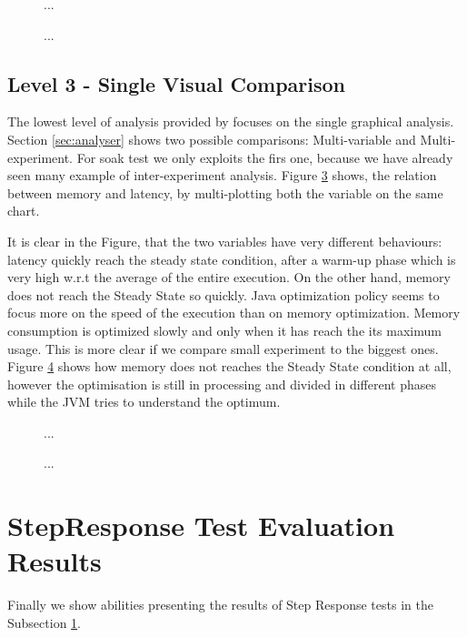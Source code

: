 \begin{figure}[hbt]
  \centering
	\caption{...} 
  	\label{fig:level2-memory}
\end{figure}
\begin{figure}[hbt]
  \centering
	\caption{...} 
  	\label{fig:level2-memory-density}
\end{figure}

\subsection{Level 3 - Single Visual Comparison}
	
The lowest level of analysis provided by \name focuses on the single graphical analysis. Section \ref{sec:analyser} shows two possible comparisons: Multi-variable and Multi-experiment. For soak test we only exploits the firs one, because we have already seen many example of inter-experiment analysis. Figure \ref{fig:level3-memory-latency-1} shows, the relation between memory and latency, by multi-plotting both the variable on the same chart.

It is clear in the Figure, that the two variables have very different behaviours: latency quickly reach the steady state condition, after a warm-up phase which is very high w.r.t the average of the entire execution. On the other hand, memory does not reach the Steady State so quickly. Java optimization policy seems to focus more on the speed of the execution than on memory optimization. Memory consumption is optimized slowly and only when it has reach the its maximum usage. This is more clear if we compare small experiment to the biggest ones. Figure \ref{fig:level3-memory-latency-2} shows how memory does not reaches the Steady State condition at all, however the optimisation is still in processing and divided in different phases while the JVM tries to understand the optimum.


\begin{figure}[hbt]
  \centering
	\caption{...} 
  	\label{fig:level3-memory-latency-1}
\end{figure}

\begin{figure}[hbt]
  \centering
	\caption{...} 
  	\label{fig:level3-memory-latency-2}
\end{figure}


\section{StepResponse Test Evaluation Results}\label{sec:stressres}
 Finally we show \name abilities presenting the results of Step Response tests in the Subsection \ref{sec:stressres}.



